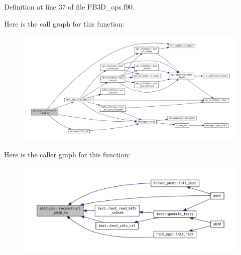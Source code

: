 Definition at line 37 of file P\+B3\+D\+\_\+ops.\+f90.

Here is the call graph for this function\+:
\nopagebreak
\begin{figure}[H]
\begin{center}
\leavevmode
\includegraphics[width=350pt]{namespacepb3d__ops_a057fc02a2d90e9ac8a7e5764d83fd1df_cgraph}
\end{center}
\end{figure}
Here is the caller graph for this function\+:
\nopagebreak
\begin{figure}[H]
\begin{center}
\leavevmode
\includegraphics[width=350pt]{namespacepb3d__ops_a057fc02a2d90e9ac8a7e5764d83fd1df_icgraph}
\end{center}
\end{figure}
\mbox{\label{namespacepb3d__ops_a418960ddc3c8c0ec6ac0af970feedbe2}} 

